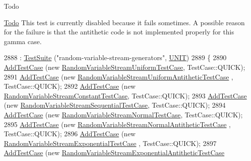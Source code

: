 \begin{DoxyRefDesc}{Todo}
\item[\hyperlink{todo__todo000012}{Todo}]This test is currently disabled because it fails sometimes. A possible reason for the failure is that the antithetic code is not implemented properly for this gamma case. \end{DoxyRefDesc}

\begin{DoxyCode}
2888   : \hyperlink{classns3_1_1TestSuite_a904b0c40583b744d30908aeb94636d1a}{TestSuite} (\textcolor{stringliteral}{"random-variable-stream-generators"}, \hyperlink{classns3_1_1TestSuite_a1ebfcab34ec8161e085e8e3a1855eae0a3885375a3787abf60431f8454b3cadbd}{UNIT})
2889 \{
2890   \hyperlink{classns3_1_1TestCase_a3718088e3eefd5d6454569d2e0ddd835}{AddTestCase} (\textcolor{keyword}{new} \hyperlink{classRandomVariableStreamUniformTestCase}{RandomVariableStreamUniformTestCase}, 
      TestCase::QUICK);
2891   \hyperlink{classns3_1_1TestCase_a3718088e3eefd5d6454569d2e0ddd835}{AddTestCase} (\textcolor{keyword}{new} \hyperlink{classRandomVariableStreamUniformAntitheticTestCase}{RandomVariableStreamUniformAntitheticTestCase}
      , TestCase::QUICK);
2892   \hyperlink{classns3_1_1TestCase_a3718088e3eefd5d6454569d2e0ddd835}{AddTestCase} (\textcolor{keyword}{new} \hyperlink{classRandomVariableStreamConstantTestCase}{RandomVariableStreamConstantTestCase}, 
      TestCase::QUICK);
2893   \hyperlink{classns3_1_1TestCase_a3718088e3eefd5d6454569d2e0ddd835}{AddTestCase} (\textcolor{keyword}{new} \hyperlink{classRandomVariableStreamSequentialTestCase}{RandomVariableStreamSequentialTestCase},
       TestCase::QUICK);
2894   \hyperlink{classns3_1_1TestCase_a3718088e3eefd5d6454569d2e0ddd835}{AddTestCase} (\textcolor{keyword}{new} \hyperlink{classRandomVariableStreamNormalTestCase}{RandomVariableStreamNormalTestCase}, 
      TestCase::QUICK);
2895   \hyperlink{classns3_1_1TestCase_a3718088e3eefd5d6454569d2e0ddd835}{AddTestCase} (\textcolor{keyword}{new} \hyperlink{classRandomVariableStreamNormalAntitheticTestCase}{RandomVariableStreamNormalAntitheticTestCase}
      , TestCase::QUICK);
2896   \hyperlink{classns3_1_1TestCase_a3718088e3eefd5d6454569d2e0ddd835}{AddTestCase} (\textcolor{keyword}{new} \hyperlink{classRandomVariableStreamExponentialTestCase}{RandomVariableStreamExponentialTestCase}
      , TestCase::QUICK);
2897   \hyperlink{classns3_1_1TestCase_a3718088e3eefd5d6454569d2e0ddd835}{AddTestCase} (\textcolor{keyword}{new} \hyperlink{classRandomVariableStreamExponentialAntitheticTestCase}{RandomVariableStreamExponentialAntitheticTestCase}

\end{DoxyCode}
